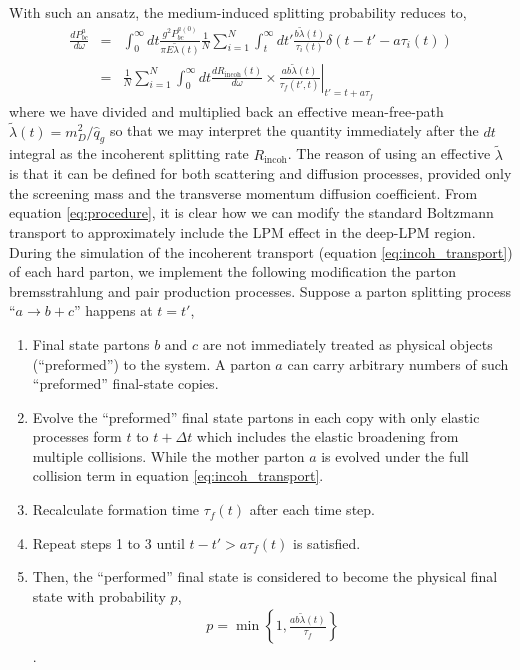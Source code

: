 \documentclass[aps, prc, reprint, amsmath, groupedaddress, nofootinbib]{revtex4-1}
\begin{document}
With such an ansatz, the medium-induced splitting probability reduces to,
\begin{eqnarray}
\nonumber
\frac{dP^{a}_{bc}}{d\omega} &=& \int_0^\infty dt \frac{g^2 P_{bc}^{a(0)}}{\pi E\tilde{\lambda}(t)} \frac{1}{N}\sum_{i=1}^N \int_t^\infty dt' \frac{b \tilde{\lambda}(t)}{\tau_i(t)} \delta(t-t'- a \tau_i(t)) \\
&=& \frac{1}{N}\sum_{i=1}^N\int_0^\infty dt \frac{dR_{\textrm{incoh}}(t)}{d\omega} \times \left.\frac{ab\tilde{\lambda}(t)}{\tau_f(t',t)}\right|_{t'=t+a\tau_f}
\label{eq:procedure}
\end{eqnarray}
where we have divided and multiplied back an effective mean-free-path $\tilde{\lambda}(t) = m_D^2/\hat{q}_g$ so that we may interpret the quantity immediately after the $dt$ integral as the incoherent splitting rate $R_{\textrm{incoh}}$.
The reason of using an effective $\tilde{\lambda}$ is that it can be defined for both scattering and diffusion processes, provided only the screening mass and the transverse momentum diffusion coefficient.
From equation \ref{eq:procedure}, it is clear how we can modify the standard Boltzmann transport to approximately include the LPM effect in the deep-LPM region.
During the simulation of the incoherent transport  (equation \ref{eq:incoh_transport}) of each hard parton, we implement the following modification the parton bremsstrahlung and pair production processes.
Suppose a parton splitting process ``$a\rightarrow b+c$'' happens at $t=t'$,
\begin{enumerate}
\item Final state partons $b$ and $c$ are not immediately treated as physical objects (``preformed'') to the system. A parton $a$ can carry arbitrary numbers of such ``preformed'' final-state copies.
\item Evolve the ``preformed'' final state partons in each copy with only  elastic processes form $t$ to $t+\Delta t$ which includes the elastic broadening from multiple collisions.
While the mother parton $a$ is evolved under the full collision term in equation \ref{eq:incoh_transport}.
\item Recalculate formation time $\tau_f(t)$ after each time step.
\item Repeat steps 1 to 3 until $t-t' > a\tau_f(t)$ is satisfied. 
\item Then, the ``performed'' final state is considered to become the physical final state with probability $p$, 
\begin{eqnarray}
p = \min\left\{1, \frac{ab\tilde{\lambda}(t)}{\tau_f}\right\}
\label{eq:rejection}
\end{eqnarray}.
\end{enumerate}
\end{document}
